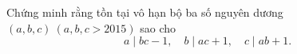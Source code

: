 \ifshowproblem
\begin{problem}\label{example:CHN-2015-NML-P8}
    Chứng minh rằng tồn tại vô hạn bộ ba số nguyên dương $(a,b,c)\ (a,b,c > 2015)$ sao cho
    \[ a \mid bc - 1,\quad b \mid ac + 1,\quad c \mid ab + 1. \]
\end{problem}
\fi

\footnotemark
{}
\fi